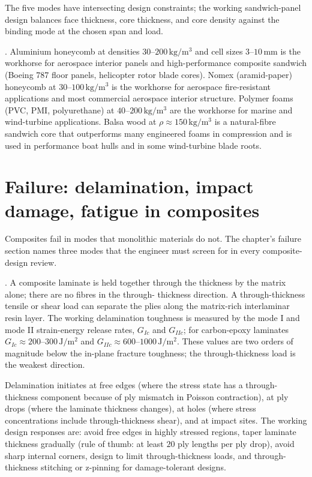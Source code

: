 The five modes have intersecting design constraints; the working
sandwich-panel design balances face thickness, core thickness, and
core density against the binding mode at the chosen span and load.

. Aluminium honeycomb at densities $30$--$200\,
\text{kg}/\text{m}^3$ and cell sizes $3$--$10\,\text{mm}$ is the
workhorse for aerospace interior panels and high-performance composite
sandwich (Boeing 787 floor panels, helicopter rotor blade cores).
Nomex (aramid-paper) honeycomb at $30$--$100\,\text{kg}/\text{m}^3$
is the workhorse for aerospace fire-resistant applications and most
commercial aerospace interior structure. Polymer foams (PVC, PMI,
polyurethane) at $40$--$200\,\text{kg}/\text{m}^3$ are the workhorse
for marine and wind-turbine applications. Balsa wood at $\rho \approx
150\,\text{kg}/\text{m}^3$ is a natural-fibre sandwich core that
outperforms many engineered foams in compression and is used in
performance boat hulls and in some wind-turbine blade roots.

\section{Failure: delamination, impact damage, fatigue in composites}

Composites fail in modes that monolithic materials do not. The chapter's
failure section names three modes that the engineer must screen for in
every composite-design review.

. A composite laminate is held together through
the thickness by the matrix alone; there are no fibres in the through-
thickness direction. A through-thickness tensile or shear load can
separate the plies along the matrix-rich interlaminar resin layer. The
working delamination toughness is measured by the mode I and mode II
strain-energy release rates, $G_{Ic}$ and $G_{IIc}$; for carbon-epoxy
laminates $G_{Ic} \approx 200$--$300\,\text{J}/\text{m}^2$ and
$G_{IIc} \approx 600$--$1000\,\text{J}/\text{m}^2$. These values are
two orders of magnitude below the in-plane fracture toughness; the
through-thickness load is the weakest direction.

Delamination initiates at free edges (where the stress state has a
through-thickness component because of ply mismatch in Poisson
contraction), at ply drops (where the laminate thickness changes), at
holes (where stress concentrations include through-thickness shear),
and at impact sites. The working design responses are: avoid free
edges in highly stressed regions, taper laminate thickness gradually
(rule of thumb: at least $20$ ply lengths per ply drop), avoid sharp
internal corners, design to limit through-thickness loads, and
through-thickness stitching or z-pinning for damage-tolerant designs.

